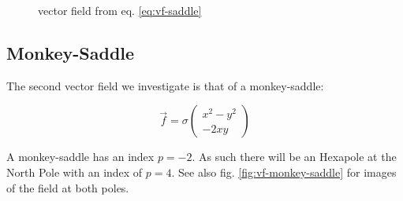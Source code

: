 \documentclass[a4paper,10pt,notitlepage]{scrartcl}
\begin{document}
\begin{figure}
  \centering
  \caption{vector field from eq. \ref{eq:vf-saddle}}
  \label{fig:vf-saddle}
\end{figure}

\subsection{Monkey-Saddle}

The second vector field we investigate is that of a monkey-saddle:

\begin{equation}
 \vec{f} = \sigma \left( \begin{array}{c}
                   x^2-y^2 \\ -2xy
                  \end{array} \right)
 \label{eq:vf-monkey-saddle}
\end{equation}

A monkey-saddle has an index $p = -2$. As such there will be an Hexapole at
the North Pole with an index of $p = 4$. See also fig.
\ref{fig:vf-monkey-saddle} for images of the field at both poles.
\end{document}
